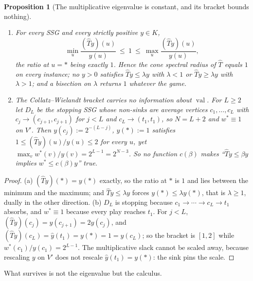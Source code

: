 \documentclass[11pt]{article}
\theoremstyle{plain}
\newtheorem{proposition}[theorem]{Proposition}
\theoremstyle{definition}
\DeclareMathOperator{\val}{val}
\begin{document}
\begin{proposition}[The multiplicative eigenvalue is constant, and its
bracket bounds nothing]\label{prop:cw}
\begin{enumerate}[label=(\alph*),leftmargin=2.2em]
\item For every SSG and every strictly positive $y\in K$,
\[
  \min_{u}\frac{(\widehat Ty)(u)}{y(u)}\ \le\ 1\ \le\
  \max_{u}\frac{(\widehat Ty)(u)}{y(u)} ,
\]
the ratio at $u=\ast$ being exactly $1$. Hence the cone spectral radius
of $\widehat T$ equals $1$ on every instance; no $y>0$ satisfies
$\widehat Ty\le\lambda y$ with $\lambda<1$ or $\widehat Ty\ge\lambda y$
with $\lambda>1$; and a bisection on $\lambda$ returns $1$ whatever the
game.
\item The Collatz--Wielandt bracket carries no information about
$\val$. For $L\ge2$ let $D_L$ be the stopping SSG whose non-sinks are
average vertices $c_1,\dots,c_L$ with $c_j\to(c_{j+1},c_{j+1})$ for
$j<L$ and $c_L\to(t_1,t_1)$, so $N=L+2$ and $w^\ast\equiv1$ on $V'$.
Then $y(c_j):=2^{-(L-j)}$, $y(\ast):=1$ satisfies
$1\le(\widehat Ty)(u)/y(u)\le2$ for every $u$, yet
$\max_{v}w^\ast(v)/y(v)=2^{L-1}=2^{N-3}$. So no function $c(\beta)$
makes ``$\widehat Ty\le\beta y$ implies $w^\ast\le c(\beta)y$'' true.
\end{enumerate}
\end{proposition}

\begin{proof}
(a) $(\widehat Ty)(\ast)=y(\ast)$ exactly, so the ratio at $\ast$ is $1$
and lies between the minimum and the maximum; and $\widehat Ty\le\lambda y$
forces $y(\ast)\le\lambda y(\ast)$, that is $\lambda\ge1$, dually in the
other direction.
(b) $D_L$ is stopping because $c_1\to\cdots\to c_L\to t_1$ absorbs, and
$w^\ast\equiv1$ because every play reaches $t_1$. For $j<L$,
$(\widehat Ty)(c_j)=y(c_{j+1})=2y(c_j)$, and
$(\widehat Ty)(c_L)=\hat y(t_1)=y(\ast)=1=y(c_L)$; so the bracket is
$[1,2]$ while $w^\ast(c_1)/y(c_1)=2^{L-1}$. The multiplicative slack
cannot be scaled away, because rescaling $y$ on $V'$ does not rescale
$\hat y(t_1)=y(\ast)$: the sink pins the scale.
\end{proof}

What survives is not the eigenvalue but the calculus.
\end{document}

